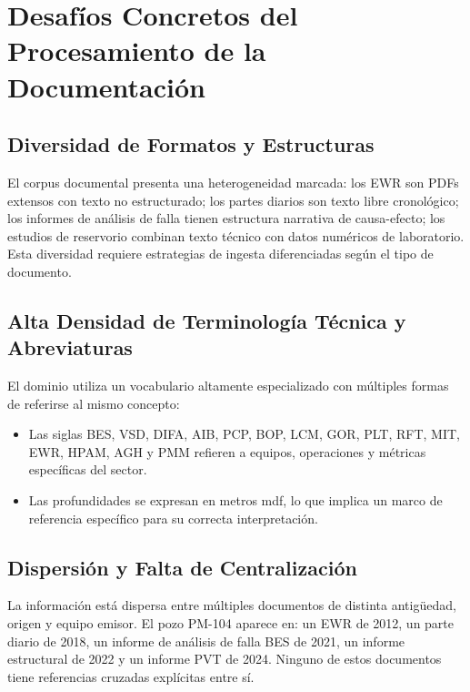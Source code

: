 \documentclass[12pt, a4paper]{article}
\begin{document}
\section{Desaf\'{i}os Concretos del Procesamiento de la Documentaci\'{o}n}

\subsection{Diversidad de Formatos y Estructuras}

El corpus documental presenta una heterogeneidad marcada: los EWR son PDFs extensos con
texto no estructurado; los partes diarios son texto libre cronol\'{o}gico; los informes de
an\'{a}lisis de falla tienen estructura narrativa de causa-efecto; los estudios de reservorio
combinan texto t\'{e}cnico con datos num\'{e}ricos de laboratorio. Esta diversidad requiere
estrategias de ingesta diferenciadas seg\'{u}n el tipo de documento.

\subsection{Alta Densidad de Terminolog\'{i}a T\'{e}cnica y Abreviaturas}

El dominio utiliza un vocabulario altamente especializado con m\'{u}ltiples formas de
referirse al mismo concepto:

\begin{itemize}
  \item Las siglas BES, VSD, DIFA, AIB, PCP, BOP, LCM, GOR, PLT, RFT, MIT, EWR, HPAM,
        AGH y PMM refieren a equipos, operaciones y m\'{e}tricas espec\'{i}ficas del sector.
  \item Las profundidades se expresan en metros mdf,
        lo que implica un marco de referencia espec\'{i}fico para su correcta interpretaci\'{o}n.
\end{itemize}

\subsection{Dispersi\'{o}n y Falta de Centralizaci\'{o}n}

La informaci\'{o}n est\'{a} dispersa entre m\'{u}ltiples documentos de distinta
antig\"{u}edad, origen y equipo emisor. El pozo PM-104 aparece en: un EWR de 2012, un
parte diario de 2018, un informe de an\'{a}lisis de falla BES de 2021, un informe estructural
de 2022 y un informe PVT de 2024. Ninguno de estos documentos tiene referencias cruzadas
expl\'{i}citas entre s\'{i}.
\end{document}
